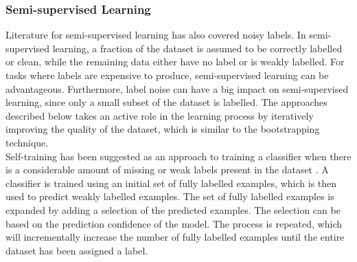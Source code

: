 









\subsubsection{Semi-supervised Learning}
Literature for semi-supervised learning has also covered noisy labels. In semi-supervised learning, a fraction of the dataset is assumed to be correctly labelled or clean, while the remaining data either have no label or is weakly labelled. For tasks where labels are expensive to produce, semi-supervised learning can be advantageous. Furthermore, label noise can have a big impact on semi-supervised learning, since only a small subset of the dataset is labelled. The approaches described below takes an active role in the learning process by iteratively improving the quality of the dataset, which is similar to the bootstrapping technique.\\

Self-training has been suggested as an approach to training a classifier when there is a considerable amount of missing or weak labels present in the dataset \citep{Rosenberg_self-training}. A classifier is trained using an initial set of fully labelled examples, which is then used to predict weakly labelled examples. The set of fully labelled examples is expanded by adding a selection of the predicted examples. The selection can be based on the prediction confidence of the model. The process is repeated, which will incrementally increase the number of fully labelled examples until the entire dataset has been assigned a label. \\

